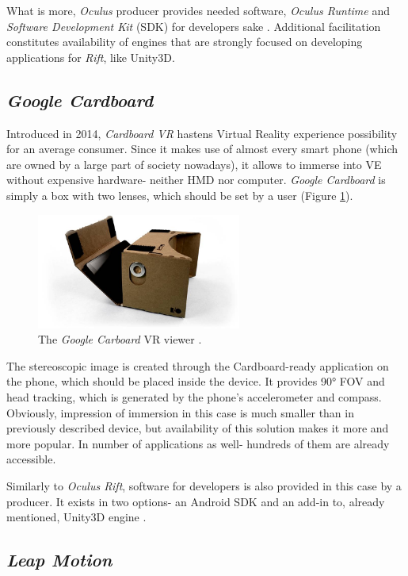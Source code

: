 What is more, \textit{Oculus} producer provides needed software, \textit{Oculus Runtime} and \textit{Software Development Kit} (SDK) for developers sake \cite{Parisi15, Oculus16}. Additional facilitation constitutes availability of engines that are strongly focused on developing applications for \textit{Rift}, like Unity3D.
\subsection{\textit{Google Cardboard}}
Introduced in 2014, \textit{Cardboard VR} hastens Virtual Reality experience possibility for an average consumer. Since it makes use of almost every smart phone (which are owned by a large part of society nowadays), it allows to immerse into VE without expensive hardware- neither HMD nor computer. \textit{Google Cardboard} is simply a box with two lenses, which should be set by a  user (Figure \ref{fig:cardboard}). 
\begin{figure}[h] 
\centering    
\includegraphics[width=0.6\textwidth]{Figs/cardboard.jpg}
\caption{The \textit{Google Carboard} VR viewer \cite{Parisi15}.}
\label{fig:cardboard}
\end{figure}
The stereoscopic image is created through the Cardboard-ready application on the phone, which should be placed inside the device. It provides 90° FOV and head tracking, which is generated by the phone's accelerometer and compass. Obviously, impression of immersion in this case is much smaller than in previously described device, but availability of this solution makes it more and more popular. In number of applications as well- hundreds of them are already accessible.

Similarly to \textit{Oculus Rift}, software for developers is also provided in this case by a producer. It exists in two options- an Android SDK and an add-in to, already mentioned, Unity3D engine \cite{Parisi15}.

\subsection{\textit{Leap Motion}}
\label{leapmotion}

